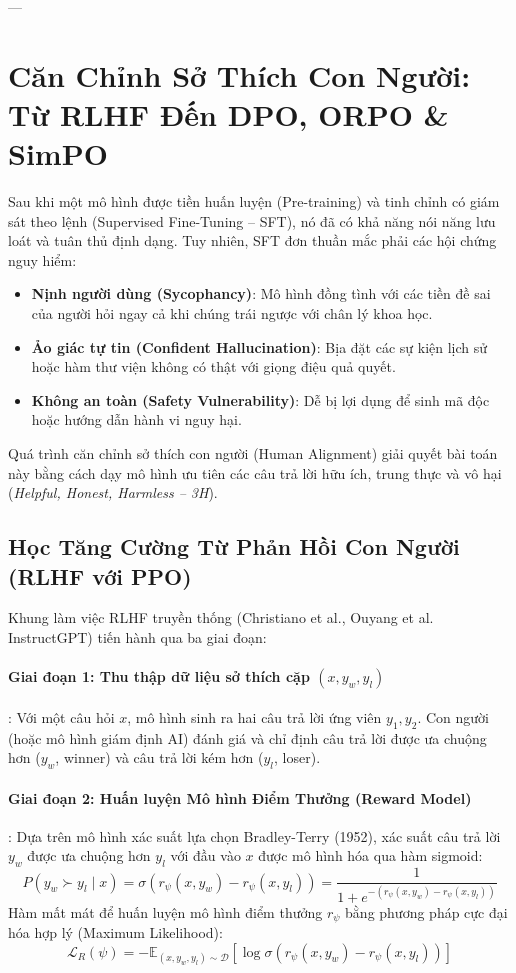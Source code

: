 ---

\section{Căn Chỉnh Sở Thích Con Người: Từ RLHF Đến DPO, ORPO \& SimPO}
\label{sec:human-alignment}

Sau khi một mô hình được tiền huấn luyện (Pre-training) và tinh chỉnh có giám sát theo lệnh (Supervised Fine-Tuning -- SFT), nó đã có khả năng nói năng lưu loát và tuân thủ định dạng. Tuy nhiên, SFT đơn thuần mắc phải các hội chứng nguy hiểm:
\begin{itemize}
  \item \textbf{Nịnh người dùng (Sycophancy)}: Mô hình đồng tình với các tiền đề sai của người hỏi ngay cả khi chúng trái ngược với chân lý khoa học.
  \item \textbf{Ảo giác tự tin (Confident Hallucination)}: Bịa đặt các sự kiện lịch sử hoặc hàm thư viện không có thật với giọng điệu quả quyết.
  \item \textbf{Không an toàn (Safety Vulnerability)}: Dễ bị lợi dụng để sinh mã độc hoặc hướng dẫn hành vi nguy hại.
\end{itemize}
Quá trình căn chỉnh sở thích con người (Human Alignment) giải quyết bài toán này bằng cách dạy mô hình ưu tiên các câu trả lời hữu ích, trung thực và vô hại (\textit{Helpful, Honest, Harmless -- 3H}).

\subsection{Học Tăng Cường Từ Phản Hồi Con Người (RLHF với PPO)}
Khung làm việc RLHF truyền thống (Christiano et al., Ouyang et al. InstructGPT) tiến hành qua ba giai đoạn:

\paragraph{Giai đoạn 1: Thu thập dữ liệu sở thích cặp $(x, y_w, y_l)$}:
Với một câu hỏi $x$, mô hình sinh ra hai câu trả lời ứng viên $y_1, y_2$. Con người (hoặc mô hình giám định AI) đánh giá và chỉ định câu trả lời được ưa chuộng hơn ($y_w$, winner) và câu trả lời kém hơn ($y_l$, loser).

\paragraph{Giai đoạn 2: Huấn luyện Mô hình Điểm Thưởng (Reward Model)}:
Dựa trên mô hình xác suất lựa chọn Bradley-Terry (1952), xác suất câu trả lời $y_w$ được ưa chuộng hơn $y_l$ với đầu vào $x$ được mô hình hóa qua hàm sigmoid:
\begin{equation}
P(y_w \succ y_l \mid x) = \sigma\left(r_\psi(x, y_w) - r_\psi(x, y_l)\right) = \frac{1}{1 + e^{-(r_\psi(x, y_w) - r_\psi(x, y_l))}}
\end{equation}
Hàm mất mát để huấn luyện mô hình điểm thưởng $r_\psi$ bằng phương pháp cực đại hóa hợp lý (Maximum Likelihood):
\begin{equation}
\mathcal{L}_R(\psi) = -\mathbb{E}_{(x, y_w, y_l) \sim \mathcal{D}} \left[ \log \sigma\left(r_\psi(x, y_w) - r_\psi(x, y_l)\right) \right]
\end{equation}

